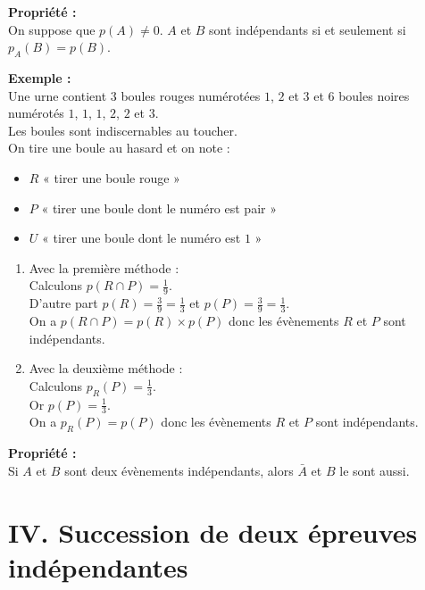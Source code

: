 \documentclass[11pt,a4paper]{article}
\begin{document}
\begin{mdframed}[style=proprieteStyle]
  \textbf{Propriété :} ~\\
  On suppose que $p(A)\not=0$. $A$ et $B$ sont indépendants si et seulement si $p_A(B)=p(B)$.
\end{mdframed}

\textbf{Exemple :} ~\\
Une urne contient $3$ boules rouges numérotées $1$, $2$ et $3$ et $6$ boules noires numérotés $1$, $1$, $1$, $2$, $2$ et $3$. \\
Les boules sont indiscernables au toucher. \\

On tire une boule au hasard et on note :
\vspace{-6pt}
\begin{itemize}
  \item $R$ « tirer une boule rouge »
  \item $P$ « tirer une boule dont le numéro est pair »
  \item $U$ « tirer une boule dont le numéro est $1$ »
\end{itemize}

\begin{enumerate}
  \item Avec la première méthode : \\
  Calculons $p(R\cap P)=\frac{1}{9}$.\\
  D'autre part $p(R)=\frac{3}{9}=\frac{1}{3}$ et $p(P)=\frac{3}{9}=\frac{1}{3}$. \\
  On a $p(R\cap P)=p(R)\times p(P)$ donc les évènements $R$ et $P$ sont indépendants.
  \item Avec la deuxième méthode : \\
  Calculons $p_R(P)=\frac{1}{3}$.\\
  Or $p(P)=\frac{1}{3}$. \\
  On a $p_R(P)=p(P)$ donc les évènements $R$ et $P$ sont indépendants.
\end{enumerate}

\begin{mdframed}[style=proprieteStyle]
  \textbf{Propriété :} ~\\
  Si $A$ et $B$ sont deux évènements indépendants, alors $\bar A$ et $B$ le sont aussi.
\end{mdframed}

\section*{IV. Succession de deux épreuves indépendantes}
\end{document}
